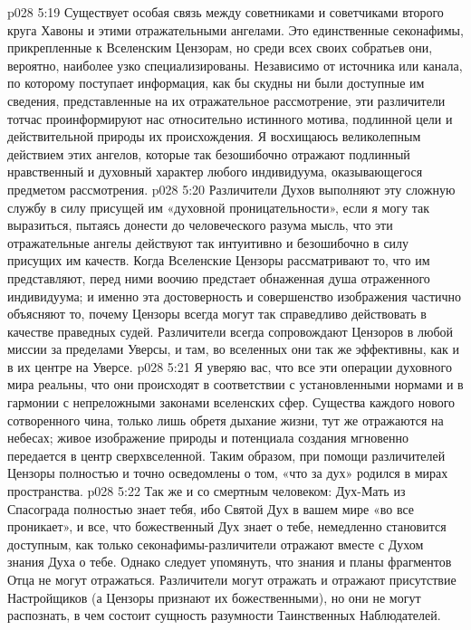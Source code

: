 \vs p028 5:19 \bibnobreakspace {} Существует особая связь между советниками и советчиками второго круга Хавоны и этими отражательными ангелами. Это единственные секонафимы, прикрепленные к Вселенским Цензорам, но среди всех своих собратьев они, вероятно, наиболее узко специализированы. Независимо от источника или канала, по которому поступает информация, как бы скудны ни были доступные им сведения, представленные на их отражательное рассмотрение, эти различители тотчас проинформируют нас относительно истинного мотива, подлинной цели и действительной природы их происхождения. Я восхищаюсь великолепным действием этих ангелов, которые так безошибочно отражают подлинный нравственный и духовный характер любого индивидуума, оказывающегося предметом рассмотрения.
\vs p028 5:20 Различители Духов выполняют эту сложную службу в силу присущей им «духовной проницательности», если я могу так выразиться, пытаясь донести до человеческого разума мысль, что эти отражательные ангелы действуют так интуитивно и безошибочно в силу присущих им качеств. Когда Вселенские Цензоры рассматривают то, что им представляют, перед ними воочию предстает обнаженная душа отраженного индивидуума; и именно эта достоверность и совершенство изображения частично объясняют то, почему Цензоры всегда могут так справедливо действовать в качестве праведных судей. Различители всегда сопровождают Цензоров в любой миссии за пределами Уверсы, и там, во вселенных они так же эффективны, как и в их центре на Уверсе.
\vs p028 5:21 Я уверяю вас, что все эти операции духовного мира реальны, что они происходят в соответствии с установленными нормами и в гармонии с непреложными законами вселенских сфер. Существа каждого нового сотворенного чина, только лишь обретя дыхание жизни, тут же отражаются на небесах; живое изображение природы и потенциала создания мгновенно передается в центр сверхвселенной. Таким образом, при помощи различителей Цензоры полностью и точно осведомлены о том, «что за дух» родился в мирах пространства.
\vs p028 5:22 Так же и со смертным человеком: Дух\hyp{}Мать из Спасограда полностью знает тебя, ибо Святой Дух в вашем мире «во все проникает», и все, что божественный Дух знает о тебе, немедленно становится доступным, как только секонафимы\hyp{}различители отражают вместе с Духом знания Духа о тебе. Однако следует упомянуть, что знания и планы фрагментов Отца не могут отражаться. Различители могут отражать и отражают присутствие Настройщиков (а Цензоры признают их божественными), но они не могут распознать, в чем состоит сущность разумности Таинственных Наблюдателей.
